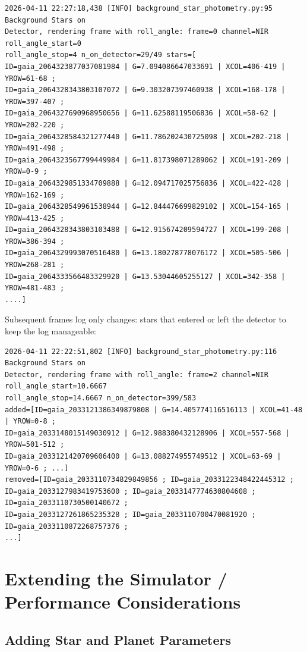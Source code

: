 \begin{verbatim}
2026-04-11 22:27:18,438 [INFO] background_star_photometry.py:95 Background Stars on 
Detector, rendering frame with roll_angle: frame=0 channel=NIR roll_angle_start=0 
roll_angle_stop=4 n_on_detector=29/49 stars=[
ID=gaia_2064323877037081984 | G=7.094086647033691 | XCOL=406-419 | YROW=61-68 ; 
ID=gaia_2064328343803107072 | G=9.303207397460938 | XCOL=168-178 | YROW=397-407 ; 
ID=gaia_2064327690968950656 | G=11.62588119506836 | XCOL=58-62 | YROW=202-220 ; 
ID=gaia_2064328584321277440 | G=11.786202430725098 | XCOL=202-218 | YROW=491-498 ; 
ID=gaia_2064323567799449984 | G=11.817398071289062 | XCOL=191-209 | YROW=0-9 ; 
ID=gaia_2064329851334709888 | G=12.094717025756836 | XCOL=422-428 | YROW=162-169 ; 
ID=gaia_2064328549961538944 | G=12.844476699829102 | XCOL=154-165 | YROW=413-425 ; 
ID=gaia_2064328343803103488 | G=12.915674209594727 | XCOL=199-208 | YROW=386-394 ; 
ID=gaia_2064329993070516480 | G=13.180278778076172 | XCOL=505-506 | YROW=268-281 ; 
ID=gaia_2064333566483329920 | G=13.53044605255127 | XCOL=342-358 | YROW=481-483 ; 
....]
\end{verbatim}

Subsequent frames log only changes: stars that entered or left the detector to keep the log manageable:

\begin{verbatim}
2026-04-11 22:22:51,802 [INFO] background_star_photometry.py:116 Background Stars on 
Detector, rendering frame with roll_angle: frame=2 channel=NIR roll_angle_start=10.6667 
roll_angle_stop=14.6667 n_on_detector=399/583 
added=[ID=gaia_2033121386349879808 | G=14.405774116516113 | XCOL=41-48 | YROW=0-8 ; 
ID=gaia_2033148015149030912 | G=12.988380432128906 | XCOL=557-568 | YROW=501-512 ; 
ID=gaia_2033121420709606400 | G=13.088274955749512 | XCOL=63-69 | YROW=0-6 ; ...] 
removed=[ID=gaia_2033110734829849856 ; ID=gaia_2033122348422445312 ; 
ID=gaia_2033127983419753600 ; ID=gaia_2033147774630804608 ; ID=gaia_2033110730500140672 ; 
ID=gaia_2033127261865235328 ; ID=gaia_2033110700470081920 ; ID=gaia_2033110872268757376 ; 
...]
\end{verbatim}

\newpage

\section{Extending the Simulator / Performance Considerations}

\subsection{Adding Star and Planet Parameters}

